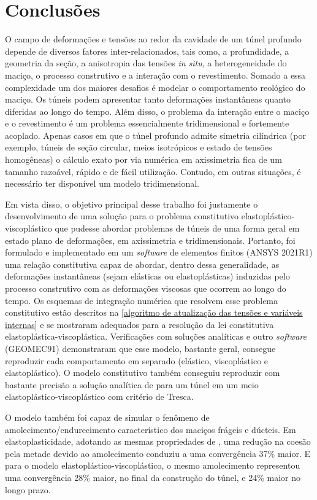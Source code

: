\chapter{Conclusões}\label{Conclusoes}


O campo de deformações e tensões ao redor da cavidade de um túnel profundo depende de diversos fatores inter-relacionados, tais como, a profundidade, a geometria da seção, a anisotropia das tensões \textit{in situ}, a heterogeneidade do maciço, o processo construtivo e a interação com o revestimento. Somado a essa complexidade um dos maiores desafios é modelar o comportamento reológico do maciço. Os túneis podem apresentar tanto deformações instantâneas quanto diferidas ao longo do tempo. Além disso, o problema da interação entre o maciço e o revestimento é um problema essencialmente tridimensional e fortemente acoplado. Apenas casos em que o túnel profundo admite simetria cilíndrica (por exemplo, túneis de seção circular, meios isotrópicos e estado de tensões homogêneas) o cálculo exato por via numérica em axissimetria fica de um tamanho razoável, rápido e de fácil utilização. Contudo, em outras situações, é necessário ter disponível um modelo tridimensional.

Em vista disso, o objetivo principal desse trabalho foi justamente o desenvolvimento de uma solução para o problema constitutivo elastoplástico-viscoplástico que pudesse abordar problemas de túneis de uma forma geral em estado plano de deformações, em axissimetria e tridimensionais. Portanto, foi formulado e implementado em um \textit{software} de elementos finitos (ANSYS 2021R1) uma relação constitutiva capaz de abordar, dentro dessa generalidade, as deformações instantâneas (sejam elásticas ou elastoplásticas) induzidas pelo processo construtivo com as deformações viscosas que ocorrem ao longo do tempo. Os esquemas de integração numérica que resolvem esse problema constitutivo estão descritos na \autoref{algoritmo de atualização das tensões e variáveis internas} e se mostraram adequados para a resolução da lei constitutiva elastoplástica-viscoplástica. Verificações com soluções analíticas e outro \textit{software} (GEOMEC91) demonstraram que esse modelo, bastante geral, consegue reproduzir cada comportamento em separado (elástico, viscoplástico e elastoplástico). O modelo constitutivo também conseguiu reproduzir com bastante precisão a solução analítica de  para um túnel em um meio elastoplástico-viscoplástico com critério de Tresca.

O modelo também foi capaz de simular o fenômeno de amolecimento/endurecimento característico dos maciços frágeis e dúcteis. Em elastoplasticidade, adotando as mesmas propriedades de , uma redução na coesão pela metade devido ao amolecimento conduziu a uma convergência 37\% maior. E para o modelo elastoplástico-viscoplástico, o mesmo amolecimento representou uma convergência 28\% maior, no final da construção do túnel, e 24\% maior no longo prazo.

